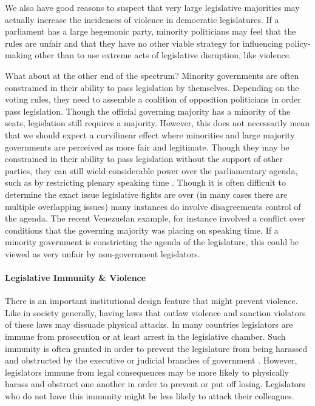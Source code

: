 \documentclass[a4paper]{article}\usepackage{graphicx, color}
\begin{document}
We also have good reasons to suspect that very large legislative majorities may actually increase the incidences of violence in democratic legislatures. If a parliament has a large hegemonic party, minority politicians may feel that the rules are unfair and that they have no other viable strategy for influencing policy-making other than to use extreme acts of legislative disruption, like violence.

What about at the other end of the spectrum? Minority governments are often constrained in their ability to pass legislation by themselves. Depending on the voting rules, they need to assemble a coalition of opposition politicians in order pass legislation. Though the official governing majority has a minority of the seats, legislation still requires a majority. However, this does not necessarily mean that we should expect a curvilinear effect where minorities and large majority governments are perceived as more fair and legitimate. Though they may be constrained in their ability to pass legislation without the support of other parties, they can still wield considerable power over the parliamentary agenda, such as by restricting plenary speaking time \citep{Tsebelis2002}. Though it is often difficult to determine the exact issue legislative fights are over (in many cases there are multiple overlapping issues) many instances do involve disagreements control of the agenda. The recent Venezuelan example, for instance involved a conflict over conditions that the governing majority was placing on speaking time. If a minority government is constricting the agenda of the legislature, this could be viewed as very unfair by non-government legislators. 

\paragraph{Legislative Immunity \& Violence}

There is an important institutional design feature that might prevent violence. Like in society generally, having laws that outlaw violence and sanction violators of these laws may dissuade physical attacks. In many countries legislators are immune from prosecution or at least arrest in the legislative chamber. Such immunity is often granted in order to prevent the legislature from being harassed and obstructed by the executive or judicial branches of government  \citep{Seghetti1984}. However, legislators immune from legal consequences may be more likely to physically harass and obstruct one another in order to prevent or put off losing. Legislators who do not have this immunity might be less likely to attack their colleagues. 
\end{document}
